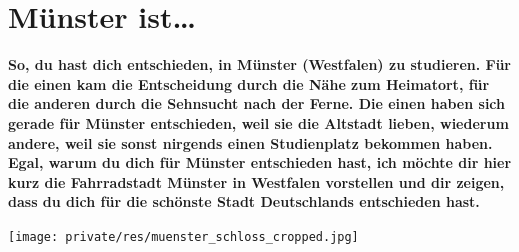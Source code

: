 \section{Münster ist\dots}
\textbf{So, du hast dich entschieden, in Münster (Westfalen) zu studieren.
	Für die einen kam die Entscheidung durch die Nähe zum Heimatort, für die anderen durch die Sehnsucht nach der Ferne.
	Die einen haben sich gerade für Münster entschieden, weil sie die Altstadt lieben, wiederum andere, weil sie sonst nirgends einen Studienplatz bekommen haben.
	Egal, warum du dich für Münster entschieden hast, ich möchte dir hier kurz die Fahrradstadt Münster in Westfalen vorstellen und dir zeigen, dass du dich für die schönste Stadt Deutschlands entschieden hast.}

\begin{center}
	\texttt{[image: private/res/muenster\_schloss\_cropped.jpg]}
\end{center}

